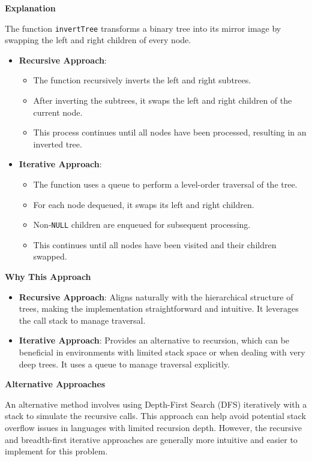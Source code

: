 \textbf{Explanation}

The function \texttt{invertTree} transforms a binary tree into its mirror image by swapping the left and right children of every node. 

\begin{itemize}
    \item \textbf{Recursive Approach}: 
    \begin{itemize}
        \item The function recursively inverts the left and right subtrees.
        \item After inverting the subtrees, it swaps the left and right children of the current node.
        \item This process continues until all nodes have been processed, resulting in an inverted tree.
    \end{itemize}
    
    \item \textbf{Iterative Approach}:
    \begin{itemize}
        \item The function uses a queue to perform a level-order traversal of the tree.
        \item For each node dequeued, it swaps its left and right children.
        \item Non-\texttt{NULL} children are enqueued for subsequent processing.
        \item This continues until all nodes have been visited and their children swapped.
    \end{itemize}
\end{itemize}

\textbf{Why This Approach}

\begin{itemize}
    \item \textbf{Recursive Approach}: Aligns naturally with the hierarchical structure of trees, making the implementation straightforward and intuitive. It leverages the call stack to manage traversal.
    \item \textbf{Iterative Approach}: Provides an alternative to recursion, which can be beneficial in environments with limited stack space or when dealing with very deep trees. It uses a queue to manage traversal explicitly.
\end{itemize}

\textbf{Alternative Approaches}

An alternative method involves using Depth-First Search (DFS) iteratively with a stack to simulate the recursive calls. This approach can help avoid potential stack overflow issues in languages with limited recursion depth. However, the recursive and breadth-first iterative approaches are generally more intuitive and easier to implement for this problem.

